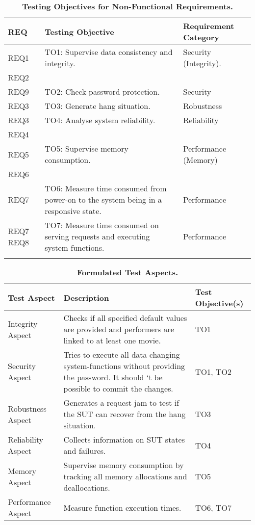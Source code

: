 \begin{table}
\caption{\textbf{Testing Objectives for Non-Functional Requirements.}}
\begin{tabular}{|p{2cm}|p{8cm}|p{4cm}|}
\hline
\textbf{REQ} & \textbf{Testing Objective} & \textbf{Requirement Category}\\
\hline
REQ1 & TO1: Supervise data consistency and integrity. & Security (Integrity).\\
REQ2 & \quad & \quad \\
\hline
REQ9 & TO2: Check password protection. & Security\\
\hline 
REQ3 & TO3: Generate hang situation. & Robustness\\
\hline 
REQ3 & TO4: Analyse system reliability. & Reliability\\
REQ4 & \quad & \quad \\
\hline 
REQ5 &TO5: Supervise memory consumption. & Performance (Memory)\\
REQ6 & \quad & \quad \\
\hline
REQ7 & TO6: Measure time consumed from power-on to the system being in a responsive state. & Performance\\
\hline 
REQ7 \quad REQ8 &TO7: Measure time consumed on serving requests and executing system-functions. & Performance\\
\quad & \quad & \quad \\
\hline
\end{tabular}
\label{obj}
\end{table}

\begin{table}
\caption{\textbf{Formulated Test Aspects.}}
\begin{tabular}{|p{4cm}|p{8cm}|p{2cm}|}
\hline
\textbf{Test Aspect} & \textbf{Description} & \textbf{Test Objective(s)}\\
\hline
Integrity Aspect & Checks if all specified default values are provided and performers are linked to at least one movie. & TO1\\
\hline
Security Aspect & Tries to execute all data changing system-functions without providing the password. It should ‘t be possible to commit the changes. & TO1, TO2\\
\hline
Robustness Aspect & Generates a request jam to test if the SUT can recover from the hang situation. & TO3\\
\hline
Reliability Aspect & Collects information on SUT states and failures. & TO4\\
\hline
Memory Aspect & Supervise memory consumption by tracking all memory allocations and deallocations. & TO5\\
\hline
Performance Aspect & Measure function execution times. & TO6, TO7\\
\hline
\end{tabular}
\label{aspects}
\end{table}

